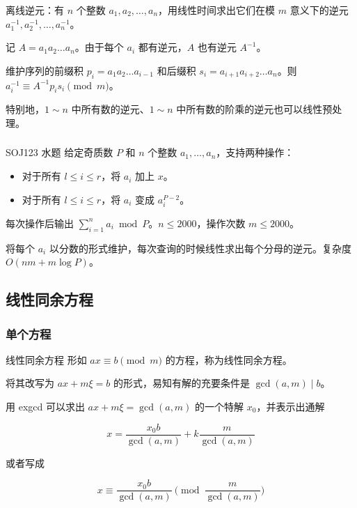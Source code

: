 \documentclass[../main.tex]{subfiles}
\begin{document}
\begin{frame}
离线逆元：有 $n$ 个整数 $a_1,a_2,\dots,a_n$，用线性时间求出它们在模 $m$ 意义下的逆元 $a_1^{-1},a_2^{-1},\dots,a_n^{-1}$。 \pause

记 $A=a_1a_2\dots a_n$。由于每个 $a_i$ 都有逆元，$A$ 也有逆元 $A^{-1}$。 \pause

维护序列的前缀积 $p_i=a_1a_2\dots a_{i-1}$ 和后缀积 $s_i=a_{i+1}a_{i+2}\dots a_n$。则 $a_i^{-1}\equiv A^{-1}p_{i}s_{i}\pmod m$。 \pause

特别地，$1\sim n$ 中所有数的逆元、$1\sim n$ 中所有数的阶乘的逆元也可以线性预处理。
\end{frame}

\subsubsection{}

\begin{frame}{SOJ123 水题}
给定奇质数 $P$ 和 $n$ 个整数 $a_1,\dots,a_n$，支持两种操作：

\begin{itemize}
\item 对于所有 $l\le i\le r$，将 $a_i$ 加上 $x$。
\item 对于所有 $l\le i\le r$，将 $a_i$ 变成 $a_i^{P-2}$。
\end{itemize}

每次操作后输出 $\sum\limits_{i=1}^na_i\bmod P$。$n\le 2000$，操作次数 $m\le 2000$。 \pause

将每个 $a_i$ 以分数的形式维护，每次查询的时候线性求出每个分母的逆元。复杂度 $O(nm+m\log P)$。
\end{frame}

\subsection{线性同余方程}

\subsubsection{单个方程}

\begin{frame}{线性同余方程}
形如 $ax\equiv b\pmod m$ 的方程，称为线性同余方程。 \pause

将其改写为 $ax+m\xi=b$ 的形式，易知有解的充要条件是 $\gcd(a,m)\mid b$。 \pause

用 exgcd 可以求出 $ax+m\xi=\gcd(a,m)$ 的一个特解 $x_0$，并表示出通解

$$
x=\frac{x_0b}{\gcd(a,m)}+k\frac{m}{\gcd(a,m)}
$$

\pause
或者写成

$$
x\equiv \frac{x_0b}{\gcd(a,m)}\pmod{\frac{m}{\gcd(a,m)}}
$$
\end{frame}
\end{document}
